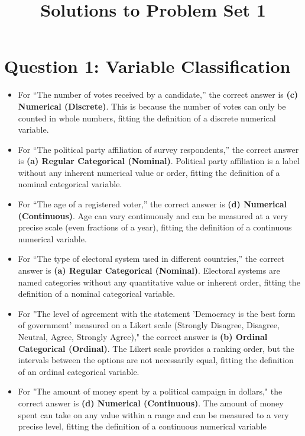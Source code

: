\documentclass{article}
\title{Solutions to Problem Set 1}
\author{}
\date{}
\begin{document}
\maketitle

\section*{Question 1: Variable Classification}
\begin{itemize}
    \item For ``The number of votes received by a candidate,'' the correct answer is \textbf{(c) Numerical (Discrete)}. This is because the number of votes can only be counted in whole numbers, fitting the definition of a discrete numerical variable.
    \item For ``The political party affiliation of survey respondents,'' the correct answer is \textbf{(a) Regular Categorical (Nominal)}. Political party affiliation is a label without any inherent numerical value or order, fitting the definition of a nominal categorical variable.
    \item For ``The age of a registered voter,'' the correct answer is \textbf{(d) Numerical (Continuous)}. Age can vary continuously and can be measured at a very precise scale (even fractions of a year), fitting the definition of a continuous numerical variable.
    \item For ``The type of electoral system used in different countries,'' the correct answer is \textbf{(a) Regular Categorical (Nominal)}. Electoral systems are named categories without any quantitative value or inherent order, fitting the definition of a nominal categorical variable.
    \item For "The level of agreement with the statement 'Democracy is the best form of government' measured on a Likert scale (Strongly Disagree, Disagree, Neutral, Agree, Strongly Agree)," the correct answer is \textbf{(b) Ordinal Categorical (Ordinal)}. The Likert scale provides a ranking order, but the intervals between the options are not necessarily equal, fitting the definition of an ordinal categorical variable.
    \item For "The amount of money spent by a political campaign in dollars," the correct answer is \textbf{(d) Numerical (Continuous)}. The amount of money spent can take on any value within a range and can be measured to a very precise level, fitting the definition of a continuous numerical variable
\end{itemize}
\end{document}

